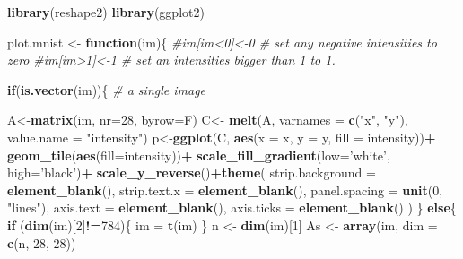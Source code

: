 \documentclass[]{book}
\newenvironment{Shaded}{\begin{snugshade}}{\end{snugshade}}
\newcommand{\CommentTok}[1]{\textcolor[rgb]{0.56,0.35,0.01}{\textit{#1}}}
\newcommand{\ControlFlowTok}[1]{\textcolor[rgb]{0.13,0.29,0.53}{\textbf{#1}}}
\newcommand{\DataTypeTok}[1]{\textcolor[rgb]{0.13,0.29,0.53}{#1}}
\newcommand{\DecValTok}[1]{\textcolor[rgb]{0.00,0.00,0.81}{#1}}
\newcommand{\KeywordTok}[1]{\textcolor[rgb]{0.13,0.29,0.53}{\textbf{#1}}}
\newcommand{\NormalTok}[1]{#1}
\newcommand{\OperatorTok}[1]{\textcolor[rgb]{0.81,0.36,0.00}{\textbf{#1}}}
\newcommand{\StringTok}[1]{\textcolor[rgb]{0.31,0.60,0.02}{#1}}
\theoremstyle{definition}
\theoremstyle{definition}
\theoremstyle{definition}
\theoremstyle{remark}
\begin{document}
\begin{Shaded}
\begin{Highlighting}[]
\KeywordTok{library}\NormalTok{(reshape2)}
\KeywordTok{library}\NormalTok{(ggplot2)}


\NormalTok{plot.mnist <-}\StringTok{ }\ControlFlowTok{function}\NormalTok{(im)\{}
  \CommentTok{#im[im<0]<-0 # set any negative intensities to zero}
  \CommentTok{#im[im>1]<-1 # set an intensities bigger than 1 to 1.}
  
  
  \ControlFlowTok{if}\NormalTok{(}\KeywordTok{is.vector}\NormalTok{(im))\{ }\CommentTok{# a single image}
    
\NormalTok{    A<-}\KeywordTok{matrix}\NormalTok{(im, }\DataTypeTok{nr=}\DecValTok{28}\NormalTok{, }\DataTypeTok{byrow=}\NormalTok{F)}
\NormalTok{    C<-}\StringTok{ }\KeywordTok{melt}\NormalTok{(A, }\DataTypeTok{varnames =} \KeywordTok{c}\NormalTok{(}\StringTok{"x"}\NormalTok{, }\StringTok{"y"}\NormalTok{), }\DataTypeTok{value.name =} \StringTok{"intensity"}\NormalTok{)}
\NormalTok{    p<-}\KeywordTok{ggplot}\NormalTok{(C, }\KeywordTok{aes}\NormalTok{(}\DataTypeTok{x =}\NormalTok{ x, }\DataTypeTok{y =}\NormalTok{ y, }\DataTypeTok{fill =}\NormalTok{ intensity))}\OperatorTok{+}
\StringTok{      }\KeywordTok{geom_tile}\NormalTok{(}\KeywordTok{aes}\NormalTok{(}\DataTypeTok{fill=}\NormalTok{intensity))}\OperatorTok{+}
\StringTok{      }\KeywordTok{scale_fill_gradient}\NormalTok{(}\DataTypeTok{low=}\StringTok{'white'}\NormalTok{, }\DataTypeTok{high=}\StringTok{'black'}\NormalTok{)}\OperatorTok{+}
\StringTok{      }\KeywordTok{scale_y_reverse}\NormalTok{()}\OperatorTok{+}\KeywordTok{theme}\NormalTok{(}
        \DataTypeTok{strip.background =} \KeywordTok{element_blank}\NormalTok{(),}
        \DataTypeTok{strip.text.x =} \KeywordTok{element_blank}\NormalTok{(),}
        \DataTypeTok{panel.spacing =} \KeywordTok{unit}\NormalTok{(}\DecValTok{0}\NormalTok{, }\StringTok{"lines"}\NormalTok{),}
        \DataTypeTok{axis.text =} \KeywordTok{element_blank}\NormalTok{(),}
        \DataTypeTok{axis.ticks =} \KeywordTok{element_blank}\NormalTok{()}
\NormalTok{      ) }
\NormalTok{  \}}
  \ControlFlowTok{else}\NormalTok{\{}
    \ControlFlowTok{if}\NormalTok{ (}\KeywordTok{dim}\NormalTok{(im)[}\DecValTok{2}\NormalTok{]}\OperatorTok{!=}\DecValTok{784}\NormalTok{)\{}
\NormalTok{      im =}\StringTok{ }\KeywordTok{t}\NormalTok{(im)}
\NormalTok{    \} }
\NormalTok{    n <-}\StringTok{ }\KeywordTok{dim}\NormalTok{(im)[}\DecValTok{1}\NormalTok{]}
\NormalTok{    As <-}\StringTok{ }\KeywordTok{array}\NormalTok{(im, }\DataTypeTok{dim =} \KeywordTok{c}\NormalTok{(n, }\DecValTok{28}\NormalTok{, }\DecValTok{28}\NormalTok{))}
    

\end{Highlighting}
\end{Shaded}
\end{document}

